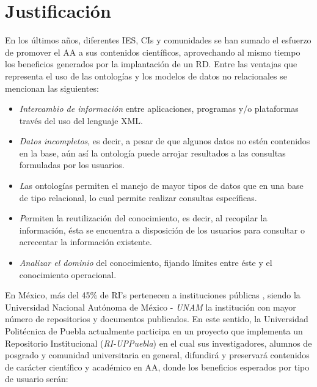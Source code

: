 \section{Justificaci\'on}

En los \'ultimos a\~{n}os, diferentes IES, CIs y comunidades se han sumado el esfuerzo de promover el AA a sus contenidos cient\'ificos, aprovechando al mismo tiempo los beneficios generados por la implantaci\'on de un RD. Entre las ventajas que representa el uso de las ontolog\'ias y los modelos de datos no relacionales se mencionan las siguientes: \cite{ASWebQuest} \cite{GuideCreatingOntology}

\begin{itemize}
\item \textit{Intercambio de informaci\'on} entre aplicaciones, programas y/o plataformas trav\'es del uso del lenguaje XML.
\item \textit{Datos incompletos}, es decir, a pesar de que algunos datos no est\'en contenidos en la base, a\'un as\'i la ontolog\'ia puede arrojar resultados a las consultas formuladas por los usuarios.
\item \textit Las ontolog\'ias permiten el manejo de mayor {tipos de datos} que en una base de tipo relacional, lo cual permite realizar consultas espec\'ificas.
\item \textit Permiten la {reutilizaci\'on del conocimiento}, es decir, al recopilar la informaci\'on, \'esta se encuentra a disposici\'on de los usuarios para consultar o acrecentar la informaci\'on existente.
\item \textit{Analizar el dominio }del conocimiento, fijando l\'imites entre \'este y el conocimiento operacional.
\end{itemize}

En M\'exico, m\'as del 45\% de RI's pertenecen a instituciones p\'ublicas \cite{RI_REMERI}, siendo la Universidad Nacional Aut\'onoma de M\'exico - \textit{UNAM} la instituci\'on con mayor n\'umero de repositorios y documentos publicados. En este sentido, la Universidad Polit\'ecnica de Puebla actualmente participa en un proyecto que implementa un Repositorio Institucional (\textit{RI-UPPuebla}) en el cual sus investigadores, alumnos de posgrado y comunidad universitaria en general, difundir\'a y preservar\'a contenidos de car\'acter cient\'ifico y acad\'emico en AA, donde los beneficios esperados por tipo de usuario ser\'an:

